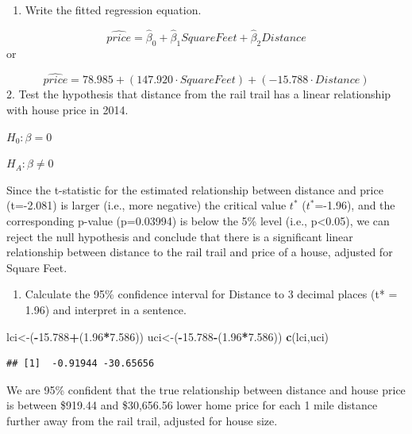 \documentclass[]{article}
\newenvironment{Shaded}{\begin{snugshade}}{\end{snugshade}}
\newcommand{\FloatTok}[1]{\textcolor[rgb]{0.00,0.00,0.81}{#1}}
\newcommand{\KeywordTok}[1]{\textcolor[rgb]{0.13,0.29,0.53}{\textbf{#1}}}
\newcommand{\NormalTok}[1]{#1}
\newcommand{\OperatorTok}[1]{\textcolor[rgb]{0.81,0.36,0.00}{\textbf{#1}}}
\providecommand{\tightlist}{%
  \setlength{\itemsep}{0pt}\setlength{\parskip}{0pt}}
\begin{document}
\begin{enumerate}
\def\labelenumi{\arabic{enumi}.}
\tightlist
\item
  Write the fitted regression equation.
\end{enumerate}

\[\widehat{price} = \hat\beta_0 + \hat\beta_1 SquareFeet + \hat\beta_2 Distance\]
or

\[\widehat{price} = 78.985 + (147.920 \cdot SquareFeet) + (-15.788 \cdot Distance)\]
2. Test the hypothesis that distance from the rail trail has a linear
relationship with house price in 2014.

\(H_0: \beta = 0\)

\(H_A: \beta \ne 0\)

Since the t-statistic for the estimated relationship between distance
and price (t=-2.081) is larger (i.e., more negative) the critical value
\(t^*\) (\(t^*\)=-1.96), and the corresponding p-value (p=0.03994) is
below the 5\% level (i.e., p\textless{}0.05), we can reject the null
hypothesis and conclude that there is a significant linear relationship
between distance to the rail trail and price of a house, adjusted for
Square Feet.

\begin{enumerate}
\def\labelenumi{\arabic{enumi}.}
\setcounter{enumi}{2}
\tightlist
\item
  Calculate the 95\% confidence interval for Distance to 3 decimal
  places (t* = 1.96) and interpret in a sentence.
\end{enumerate}

\begin{Shaded}
\begin{Highlighting}[]
\NormalTok{lci<-(}\OperatorTok{-}\FloatTok{15.788}\OperatorTok{+}\NormalTok{(}\FloatTok{1.96}\OperatorTok{*}\FloatTok{7.586}\NormalTok{))}
\NormalTok{uci<-(}\OperatorTok{-}\FloatTok{15.788}\OperatorTok{-}\NormalTok{(}\FloatTok{1.96}\OperatorTok{*}\FloatTok{7.586}\NormalTok{))}
\KeywordTok{c}\NormalTok{(lci,uci)}
\end{Highlighting}
\end{Shaded}

\begin{verbatim}
## [1]  -0.91944 -30.65656
\end{verbatim}

We are 95\% confident that the true relationship between distance and
house price is between \$919.44 and \$30,656.56 lower home price for
each 1 mile distance further away from the rail trail, adjusted for
house size.
\end{document}
